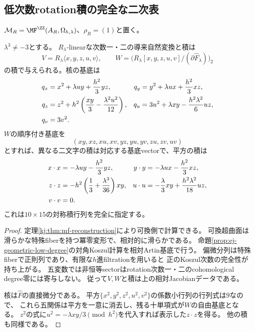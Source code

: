 \subsection{低次数rotation積の完全な二次表}

$\mathcal M_R=\MF^{\ZZ}(A_R,\Omega_{h,\lambda})$、$\rho_R=(1)$と置く。
\begin{corollary}[MF pairの低次数積]\label{kj:cor:conditional-Nat}
$\lambda^3\ne-3$とする。
$R_\lambda$-linearな次数一・二の導来自然変換と積は
\[
 V=R_\lambda\langle x,y,z,u,v\rangle,\qquad
 W=\bigl(R_\lambda[x,y,z,u,v]/(\partial\widehat F_\lambda)\bigr)_2
\]
の積で与えられる。核の基底は
\begin{align}
 q_x&=x^2+\lambda uy+\frac{h^2}{3}yz,&
 q_y&=y^2+\lambda ux+\frac{h^2}{3}xz,\notag\\
 q_z&=z^2+h^2\left(\frac{xy}{3}-\frac{\lambda^2u^2}{12}\right),&
 q_u&=3u^2+\lambda xy-\frac{h^2\lambda^2}{6}uz,\notag\\
 q_v&=3v^2.&&\label{kj:eq:gradient-kernel}
\end{align}
$W$の順序付き基底を
\begin{equation}\label{kj:eq:W-basis}
 (xy,xz,xu,xv,yz,yu,yv,zu,zv,uv)
\end{equation}
とすれば、異なる二文字の積は対応する基底vectorで、平方の積は
\begin{align}
 x\cdot x&=-\lambda uy-\frac{h^2}{3}yz,&
 y\cdot y&=-\lambda ux-\frac{h^2}{3}xz,\notag\\
 z\cdot z&=-h^2\left(\frac13+\frac{\lambda^3}{36}\right)xy,&
 u\cdot u&=-\frac{\lambda}{3}xy+\frac{h^2\lambda^2}{18}uz,\notag\\
 v\cdot v&=0.&&\label{kj:eq:multiplication-table}
\end{align}
これは$10\times15$の対称積行列を完全に指定する。
\end{corollary}
\begin{proof}
定理\ref{kj:thm:mf-reconstruction}により可換側で計算できる。
可換超曲面は滑らかな特殊fiberを持つ冪零変形で、相対的に滑らかである。
命題\ref{prop:ej-geometric-low-degree}の対角Koszul計算を相対Artin基底で行う。
偏微分列は特殊fiberで正則列であり、有限な$h$進filtrationを用いると
正のKoszul次数の完全性が持ち上がる。
五変数では非恒等sectorはrotation次数一・二のcohomological degree零には寄与しない。
従って$V,W$と積は上の相対Jacobianデータである。

核は$\widehat F$の直接微分である。
平方$\{x^2,y^2,z^2,u^2,v^2\}$の係数小行列の行列式は$9$なので、
これら五関係は平方を一意に消去し、残る十単項式が$W$の自由基底となる。
$z^2$の式に$u^2=-\lambda xy/3\pmod{h^2}$を代入すれば表示した$z\cdot z$を得る。
他の積も同様である。
\end{proof}

